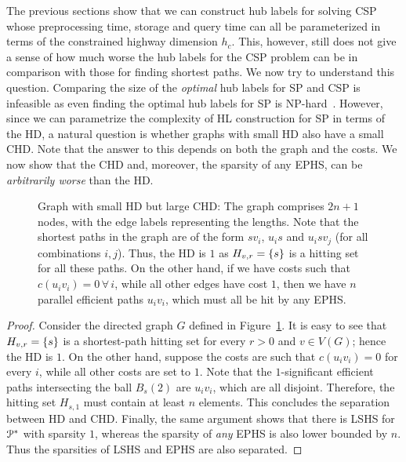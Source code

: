 The previous sections show that we can construct hub labels for solving CSP whose preprocessing time, storage and query time can all be parameterized in terms of the constrained highway dimension $h_c$. 
This, however, still does not give a sense of how much worse the hub labels for the CSP problem can be in comparison with those for finding shortest paths. 
We now try to understand this question.
Comparing the size of the \emph{optimal} hub labels for SP and CSP is infeasible as even finding the optimal hub labels for SP is NP-hard~\citep{babenko_hl_complexity}. 
However, since we can parametrize the complexity of HL construction for SP in terms of the HD, a natural question is whether graphs with small HD also have a small CHD. 
Note that the answer to this depends on both the graph and the costs.
We now show that the CHD and, moreover, the sparsity of any EPHS, can be \emph{arbitrarily worse} than the HD. 
\begin{figure}

\caption{Graph with small HD but large CHD: The graph comprises $2n+1$ nodes, with the edge labels representing the lengths. Note that the shortest paths in the graph are of the form $sv_i$, $u_is$ and $u_isv_j$ (for all combinations $i,j$). Thus, the HD is $1$ as $H_{v,r}=\{s\}$ is a hitting set for all these paths. On the other hand, if we have costs such that $c(u_iv_i)=0\,\forall\,i$, while all other edges have cost $1$, then we have $n$ parallel efficient paths $u_iv_i$, which must all be hit by any EPHS.}
\label{fig:big_chd}
\end{figure}
\begin{proof}
Consider the directed graph $G$ defined in Figure~\ref{fig:big_chd}.
It is easy to see that $H_{v,r}=\{s\}$ is a shortest-path hitting set for every $r>0$ and $v\in V(G)$; hence the HD is $1$.
On the other hand, suppose the costs are such that $c(u_iv_i)=0$ for every $i$, while all other costs are set to $1$.
Note that the $1$-significant efficient paths intersecting the ball $B_s(2)$ are $u_iv_i$, which are all disjoint.
Therefore, the hitting set $H_{s,1}$ must contain at least $n$ elements. 
This concludes the separation between HD and CHD.
Finally, the same argument shows that there is LSHS for $\mathcal{P}^*$ with sparsity $1$, whereas the sparsity of \emph{any} EPHS is also lower bounded by $n$.
Thus the sparsities of LSHS and EPHS are also separated. 
\end{proof}

